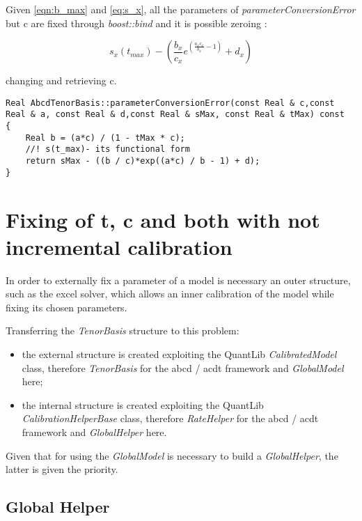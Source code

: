 Given \eqref{eqn:b_max} and \eqref{eq:s_x}, all the parameters of \textit{parameterConversionError} but c are fixed through \textit{boost::bind} and it is possible zeroing :

\begin{equation*}
s_{x}(t_{max})-\left(\frac{b_{x}}{c_{x}} e^{(\frac{a_{x}c_{x}}{b_{x}}-1)} +d_{x}\right)
\end{equation*}

changing and retrieving c.

\begin{lstlisting}
Real AbcdTenorBasis::parameterConversionError(const Real & c,const Real & a, const Real & d,const Real & sMax, const Real & tMax) const 
{
	Real b = (a*c) / (1 - tMax * c);
	//! s(t_max)- its functional form
	return sMax - ((b / c)*exp((a*c) / b - 1) + d);
}
\end{lstlisting} 

\section{Fixing of t, c and both with not incremental calibration}

In order to externally fix a parameter of a model is necessary an outer structure, such as the excel solver, which allows an inner calibration of the model while fixing its chosen parameters.

Transferring the \textit{TenorBasis} structure to this problem:

\begin{itemize}
    \item the external structure is created exploiting the QuantLib \textit{CalibratedModel} class, therefore \textit{TenorBasis} for the abcd / acdt framework and \textit{GlobalModel} here;
    
    \item the internal structure is created exploiting the QuantLib \textit{CalibrationHelperBase} class, therefore \textit{RateHelper} for the abcd / acdt framework and \textit{GlobalHelper} here.
\end{itemize}

Given that for using the \textit{GlobalModel} is necessary to build a \textit{GlobalHelper}, the latter is given the priority.

\subsection{Global Helper}

